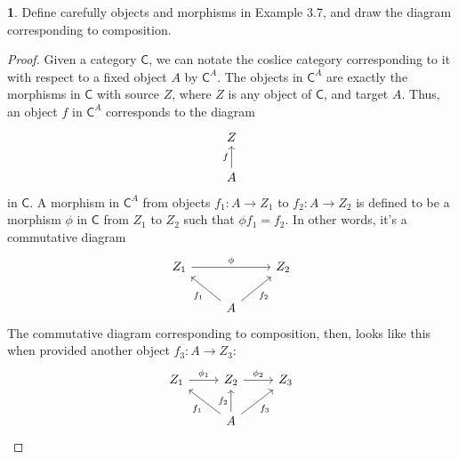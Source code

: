 \documentclass{article}
\newcounter{section-number}
\theoremstyle{definition}
\newtheorem{ex}{}[section-number]
\begin{document}
\begin{ex}
	Define carefully objects and morphisms in Example 3.7, and draw the diagram corresponding to composition.
\end{ex}
\begin{proof}
	Given a category $\mathsf{C}$, we can notate the coslice category corresponding to it with respect to a fixed object $A$ by $\mathsf{C}^A$.
	The objects in $\mathsf{C}^A$ are exactly the morphisms in $\mathsf{C}$ with source $Z$, where $Z$ is any object of $\mathsf{C}$, and target $A$.
	Thus, an object $f$ in $\mathsf{C}^A$ corresponds to the diagram \begin{equation*}
		\begin{tikzcd}
			Z \\
			A \arrow[u, "f"]
		\end{tikzcd}
	\end{equation*}
	in $\mathsf{C}$.
	A morphism in $\mathsf{C}^A$ from objects $f_1: A \to Z_1$ to $f_2: A \to Z_2$ is defined to be a morphism $\phi$ in $\mathsf{C}$ from $Z_1$ to $Z_2$ such that $\phi f_1 = f_2$.
	In other words, it's a commutative diagram \begin{equation*}
		\begin{tikzcd}
			Z_1 \arrow[rr, "\phi"] & & Z_2 \\
			& A \arrow[ul, "f_1"] \arrow[ur, "f_2"'] &
		\end{tikzcd}
	\end{equation*}
	The commutative diagram corresponding to composition, then, looks like this when provided another object $f_3: A \to Z_3$: \begin{equation*}
		\begin{tikzcd}
			Z_1 \arrow[r, "\phi_1"] & Z_2 \arrow[r, "\phi_2"] & Z_3 \\
			& A \arrow[ul, "f_1"] \arrow[u, "f_2"] \arrow[ur, "f_3"']
		\end{tikzcd}
	\end{equation*}
\end{proof}
\end{document}

